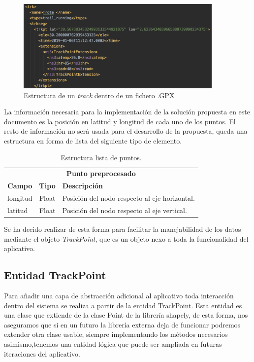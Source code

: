 \begin{figure}[htb]
\begin{center}
\includegraphics[width=0.9\textwidth]{./Imagenes/WayPointStructure.png}
\caption{Estructura de un \textit{track} dentro de un fichero .\ac{GPX}}
\label{figure: WayPointStructure}
\end{center}
\end{figure}


La información necesaria para la implementación de la solución propuesta en este documento es 
la posición en latitud y longitud de cada uno de los puntos. El resto de información no será usada 
para el desarrollo de la propuesta, queda una estructura en forma de lista del siguiente tipo de 
elemento.
\begin{table}[h]
\centering
\begin{tabular}{l | c | l} 
\toprule
\multicolumn{3}{c}{\textbf{Punto preprocesado}} \\ 
\cmidrule(r){1-3}
{\textbf{Campo}} &  {\textbf{Tipo}} & {\textbf{Descripción}} \\
\cmidrule(r){1-3}
{longitud}  & Float & Posición del nodo respecto al eje horizontal. \\
{latitud}  & Float & Posición del nodo respecto al eje vertical.\\
\bottomrule
\end{tabular}
\caption{Estructura lista de puntos.}
\label{TablaNodo}
\end{table}
\newpage
Se ha decido realizar de esta forma para facilitar la manejabilidad de los datos mediante el objeto 
\textit{TrackPoint}, que es un objeto nexo a toda la funcionalidad del aplicativo. 

\subsection{Entidad TrackPoint}
Para añadir una capa de abstracción adicional al aplicativo toda interacción dentro del sistema se 
realiza a partir de la entidad TrackPoint. Esta entidad es una clase que extiende de la clase Point 
de la librería shapely, de esta forma, nos aseguramos que si en un futuro la librería externa deja de 
funcionar podremos extender otra clase usable, siempre implementando los métodos necesarios 
asimismo,tenemos una entidad lógica que puede ser ampliada en futuras iteraciones del 
aplicativo.

